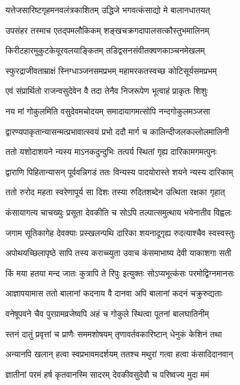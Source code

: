 \twolineshloka
{यत्तेजसारिष्टगृहमनवलंत्रकाशितम्}
{उद्धिजे भगवत्कंसाद्यो मे बालानधातयत्}%

\twolineshloka
{उपसंहर तस्माच एतद्पमलौकिकम्}
{शङ्खचक्रगदापालसत्कौस्तुभमालिनम्}%

\twolineshloka
{किरीटहारमुकुटकेयूरवलयाङ्कितम्}
{तडिद्वसनसंवीतक्वणकाञ्चनमेखलम्}%

\twolineshloka
{स्फुरद्राजीवताम्राक्षं स्निग्धाञ्जनसमप्रभम्}
{महामरकतस्वच्छ कोटिसूर्यसमप्रभम्}%

\twolineshloka
{एवं संप्रार्थितो राजन्वसुदेवेन वै तदा}
{तेनैव निजरूपेण भूत्वाहं प्राकृतः शिशुः}%

\twolineshloka
{नय मां गोकुलमिति वसुदेवमचोदयम्}
{समादायागमत्सोपि नन्दगोकुलमञ्जसा}%

\twolineshloka
{द्वारण्यपाकृतान्यासन्मत्प्रभावात्स्वयं प्रभो}
{ददौ मार्ग च कालिन्दीजलकल्लोलमालिनी}%

\twolineshloka
{ततो यशोदाशयने न्यस्य माऽनकदुन्दुभिः}
{तत्पर्य स्थितां गृह्य दारिकामगमत्पुनः}%

\twolineshloka
{द्वाराणि पिहितान्यासन् पूर्ववन्निगडं ततः}
{विन्यस्य पादयोरास्ते शयने न्यस्य दारिकाम्}%

\twolineshloka
{ततो रुरोद महता स्वरेणापूर्य सा दिशः}
{तस्या रुदितशब्देन उत्थिता रक्षका गृहात्}%

\twolineshloka
{कंसायागत्य चाचख्युः प्रसूता देवकीति च}
{सोऽपि तल्पात्समुत्थाय भयेनातीव विह्वलः}%

\twolineshloka
{जगाम सूतिकागेह देवक्याः प्रस्खलन्पथि}
{दारिका शयनादूगृह्य रुदत्याश्चैव स्वस्वस्तुः}%

\twolineshloka
{अपोथयच्छिलापृष्ठे सापि तस्य कराच्च्युता}
{उवाच कंसमाभाष्य देवी याकाशगा सती}%

\twolineshloka
{किं मया हतया मन्द जातः कुत्रापि ते रिपुः}
{इत्युक्तः सोऽप्यभूत्कंसः परमोद्विग्नमानसः}%

\twolineshloka
{आज्ञापयामास ततो बालानां कदनाय वै}
{दानवा अपि बालानां कदनं चक्रुरुद्यताः}%

\twolineshloka
{वनेषूपवने चैव पुरग्रामव्रजेष्वपि}
{अहं च गोकुले स्थित्वा पूतनां बालघातिनीम्}%

\twolineshloka
{स्तनं दातुं प्रवृत्तां च प्राणैः सममशोषयम्}
{तृणावर्तवकारिष्टान् धेनुकं केशिनं तथा}%

\twolineshloka
{अन्यानपि खलान् हत्वा स्वप्रभावमदर्शयम्}
{ततश्च मथुरां गत्वा हत्वा कंसादिदानवान्}%

\twolineshloka
{ज्ञातीनां परमं हर्ष कृतवानस्मि सादरम्}
{देवकीवसुदेवौ च परिष्वज्य मुदा ममं}%

